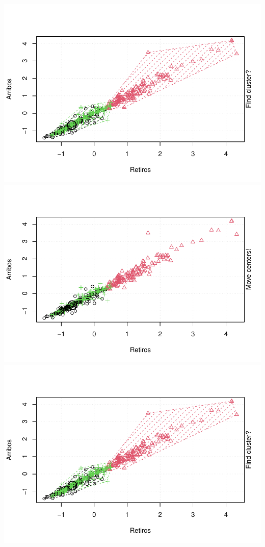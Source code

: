 \documentclass[
]{article}
\begin{document}
\includegraphics{Ecobici_files/figure-latex/unnamed-chunk-12-10.pdf}
\includegraphics{Ecobici_files/figure-latex/unnamed-chunk-12-11.pdf}
\includegraphics{Ecobici_files/figure-latex/unnamed-chunk-12-12.pdf}
\end{document}
